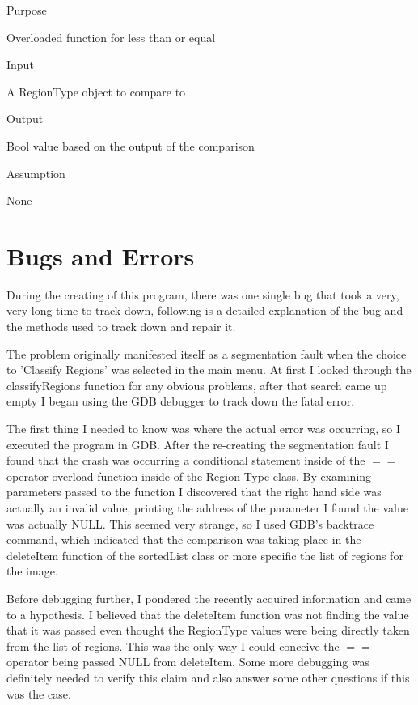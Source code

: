 \documentclass[pdftex, 12pt]{article}
\begin{document}
\begin{description}
\begin{description}
			\item{Purpose}

				Overloaded function for less than or equal

			\item{Input}

				A RegionType object to compare to

			\item{Output}

				Bool value based on the output of the comparison

			\item{Assumption}

				None

		\end{description}
		\section{Bugs and Errors}

		During the creating of this program, there was one single bug that took a very, very long time to track down, following
		is a detailed explanation of the bug and the methods used to track down and repair it.

		The problem originally manifested itself as a segmentation fault when the choice to 'Classify Regions' was selected in
		the main menu.  At first I looked through the classifyRegions function for any obvious problems, after that search came
		up empty I began using the GDB debugger to track down the fatal error.

		The first thing I needed to know was where the actual error was occurring, so I executed the program in GDB.  After the
		re-creating the segmentation fault I found that the crash was occurring a conditional statement inside of the $==$
		operator overload function inside of the Region Type class.  By examining parameters passed to the function I discovered
		that the right hand side was actually an invalid value, printing the address of the parameter I found the value was
		actually NULL.  This seemed very strange, so I used GDB's backtrace command, which indicated that the comparison was
		taking place in the deleteItem function of the sortedList class or more specific the list of regions for the image.

		Before debugging further, I pondered the recently acquired information and came to a hypothesis.  I believed that the
		deleteItem function was not finding the value that it was passed even thought the RegionType values were being directly
		taken from the list of regions.  This was the only way I could conceive the $==$ operator being passed NULL from
		deleteItem.  Some more debugging was definitely needed to verify this claim and also answer some other questions if this
		was the case.


\end{description}
\end{document}
